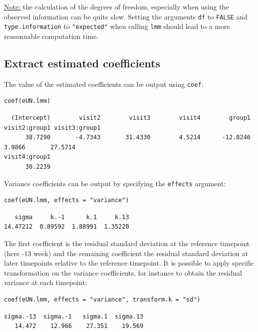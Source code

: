 \documentclass[12pt]{article}
\begin{document}
\uline{Note:} the calculation of the degrees of freedom, especially when
using the observed information can be quite slow. Setting the
arguments \texttt{df} to \texttt{FALSE} and \texttt{type.information} to \texttt{"expected"} when
calling \texttt{lmm} should lead to a more reasonnable computation time.

\subsection{Extract estimated coefficients}
\label{sec:org71044da}
The value of the estimated coefficients can be output using \texttt{coef}:
\lstset{language=r,label= ,caption= ,captionpos=b,numbers=none}
\begin{lstlisting}
coef(eUN.lmm)
\end{lstlisting}

\begin{verbatim}
  (Intercept)        visit2        visit3        visit4        group1 visit2:group1 visit3:group1 
      38.7290       -4.7343       31.4330        4.5214      -12.8246        3.9866       27.5714 
visit4:group1 
      30.2239
\end{verbatim}


Variance coefficients can be output by specifying the \texttt{effects} argument:
\lstset{language=r,label= ,caption= ,captionpos=b,numbers=none}
\begin{lstlisting}
coef(eUN.lmm, effects = "variance")
\end{lstlisting}

\begin{verbatim}
   sigma     k.-1      k.1     k.13 
14.47212  0.89592  1.88991  1.35220
\end{verbatim}


The first coefficient is the residual standard deviation at the
reference timepoint (here -13 week) and the remaining coefficient the
residual standard deviation at later timepoints relative to the
reference timepoint. It is possible to apply specific transformation
on the variance coefficients, for instance to obtain the residual
variance at each timepoint:
\lstset{language=r,label= ,caption= ,captionpos=b,numbers=none}
\begin{lstlisting}
coef(eUN.lmm, effects = "variance", transform.k = "sd")
\end{lstlisting}

\begin{verbatim}
sigma.-13  sigma.-1   sigma.1  sigma.13 
   14.472    12.966    27.351    19.569
\end{verbatim}
\end{document}
